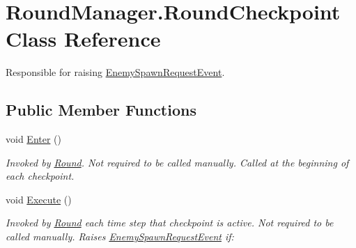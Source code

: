 \hypertarget{class_round_manager_1_1_round_checkpoint}{}\section{Round\+Manager.\+Round\+Checkpoint Class Reference}
\label{class_round_manager_1_1_round_checkpoint}


Responsible for raising \hyperlink{class_round_manager_1_1_events_1_1_enemy_spawn_request_event}{Enemy\+Spawn\+Request\+Event}.  


\subsection*{Public Member Functions}
\begin{DoxyCompactItemize}
\item 
void \hyperlink{class_round_manager_1_1_round_checkpoint_a8b8e190a0804b829e03baeec0b874718}{Enter} ()
\begin{DoxyCompactList}\small\item\em Invoked by \hyperlink{class_round_manager_1_1_round}{Round}. Not required to be called manually. Called at the beginning of each checkpoint. \end{DoxyCompactList}\item 
void \hyperlink{class_round_manager_1_1_round_checkpoint_a126566a3a5d6e8c0a23f226cfdf05ada}{Execute} ()
\begin{DoxyCompactList}\small\item\em Invoked by \hyperlink{class_round_manager_1_1_round}{Round} each time step that checkpoint is active. Not required to be called manually. Raises \hyperlink{class_round_manager_1_1_events_1_1_enemy_spawn_request_event}{Enemy\+Spawn\+Request\+Event} if\+: ~\newline
\end{DoxyCompactList}\end{DoxyCompactItemize}
